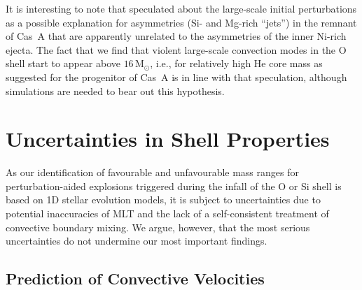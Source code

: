 \documentclass[useAMS,usenatbib]{mnras}
\newcommand{\Msun}{\ensuremath{\mathrm{M}_\odot}}
\begin{document}
It is interesting to note that \citet{wongwathanarat_17} speculated
about the large-scale initial perturbations as a possible explanation
for asymmetries (Si- and Mg-rich ``jets'') in the remnant of Cas~A
that are apparently unrelated to the asymmetries of the inner Ni-rich
ejecta.  The fact that we find that violent large-scale convection
modes in the O shell start to appear above $16 \,\Msun$, i.e., for
relatively high He core mass as suggested for the progenitor of Cas~A
is in line with that speculation, although simulations are needed to bear
out this hypothesis.

\section{Uncertainties in Shell Properties}

As our identification of favourable and unfavourable mass ranges for
perturbation-aided explosions triggered during the infall of the O or
Si shell is based on 1D stellar evolution models, it is subject to
uncertainties due to potential inaccuracies of MLT and the lack of a
self-consistent treatment of convective boundary mixing. We argue,
however, that the most serious uncertainties do not undermine our
most important findings.

\subsection{Prediction of Convective Velocities}
\label{sec:mlt_uncertainties}
\end{document}
